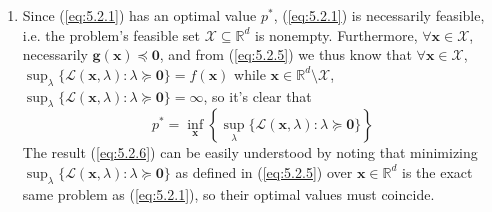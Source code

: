\documentclass{article}
\numberwithin{equation}{section}
\begin{document}
\begin{enumerate}[label=\alph*.]
    \item
    Since (\ref{eq:5.2.1}) has an optimal value $ p^* $, (\ref{eq:5.2.1}) is
    necessarily feasible, i.e. the problem's feasible set
    $ \mathcal{X} \subseteq \mathbb{R}^d $ is nonempty. Furthermore,
    $ \forall \mathbf{x} \in \mathcal{X} $, necessarily
    $ \mathbf{g}(\mathbf{x}) \preceq \mathbf{0} $, and from (\ref{eq:5.2.5})
    we thus know that $ \forall \mathbf{x} \in \mathcal{X} $,
    $ \sup_\lambda\{\mathcal{L}(\mathbf{x}, \lambda) : \lambda \succeq
    \mathbf{0}\} = f(\mathbf{x}) $ while
    $ \mathbf{x} \in \mathbb{R}^d \setminus \mathcal{X} $,
    $ \sup_\lambda\{\mathcal{L}(\mathbf{x}, \lambda) : \lambda \succeq
    \mathbf{0}\} = \infty $, so it's clear that
    \begin{equation} \label{eq:5.2.6}
        p^* = \inf_\mathbf{x}\left\{
            \sup_\lambda
            \{\mathcal{L}(\mathbf{x}, \lambda) : \lambda \succeq \mathbf{0}\}
        \right\}
    \end{equation}
    The result (\ref{eq:5.2.6}) can be easily understood by noting that
    minimizing $ \sup_\lambda\{\mathcal{L}(\mathbf{x}, \lambda) :
    \lambda \succeq \mathbf{0}\} $ as defined in (\ref{eq:5.2.5}) over
    $ \mathbf{x} \in \mathbb{R}^d $ is the exact same problem as
    (\ref{eq:5.2.1}), so their optimal values must coincide.


\end{enumerate}
\end{document}
